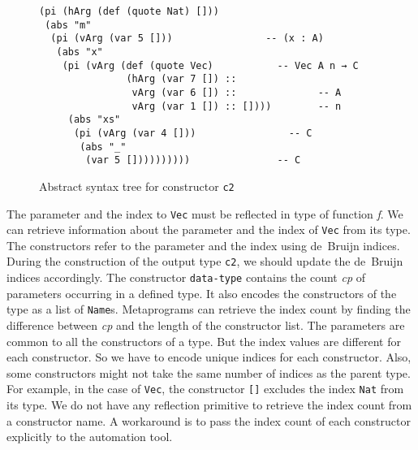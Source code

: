 \documentclass[sigplan,10pt]{acmart}
\begin{document}
\begin{figure}
\begin{center}
\begingroup
\fontsize{7pt}{9pt}\selectfont
\begin{Verbatim}[frame = single]
(pi (hArg (def (quote Nat) []))
 (abs "m"
  (pi (vArg (var 5 []))                -- (x : A)
   (abs "x"
    (pi (vArg (def (quote Vec)           -- Vec A n → C
               (hArg (var 7 []) ::              
                vArg (var 6 []) ::              -- A
                vArg (var 1 []) :: [])))        -- n
     (abs "xs"
      (pi (vArg (var 4 []))                -- C 
       (abs "_" 
        (var 5 [])))))))))               -- C
\end{Verbatim}
\endgroup
\end{center}
\caption{Abstract syntax tree for constructor {\tt c2}}
\label{fig:ast-d}
\end{figure}

\normalsize

The parameter and the index to {\tt Vec} must be reflected in type of function \emph{f}. We can retrieve information about the parameter and the index of {\tt Vec} from its type. The constructors refer to the parameter and the index using de~Bruijn indices. During the construction of the output type {\tt c2}, we should update the de~Bruijn indices accordingly. The constructor {\tt data-type} contains the count \emph{cp} of parameters occurring in a defined type. It also encodes the constructors of the type as a list of \texttt{Name}s. Metaprograms can retrieve the index count by finding the difference between \emph{cp} and the length of the constructor list. The parameters are common to all the constructors of a type. But the index values are different for each constructor. So we have to encode unique indices for each constructor. Also, some constructors might not take the same number of indices as the parent type. For example, in the case of {\tt Vec}, the constructor {\tt []} excludes the index {\tt Nat} from its type. We do not have any reflection primitive to retrieve the index count from a constructor name. A workaround is to pass the index count of each constructor explicitly to the automation tool.
\end{document}
